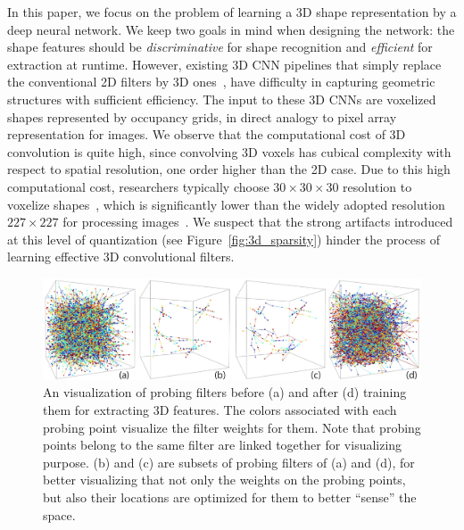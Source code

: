 In this paper, we focus on the problem of learning a 3D shape representation by a deep neural network. We keep two goals in mind when designing the network: the shape features should be \emph{discriminative} for shape recognition and \emph{efficient} for extraction at runtime. However, existing 3D CNN pipelines that simply replace the conventional 2D filters by 3D ones~\cite{WU_CVPR15_3D,Maturana_IROS15_VoxNet}, have difficulty in capturing geometric structures with sufficient efficiency. The input to these 3D CNNs are voxelized shapes represented by occupancy grids, in direct analogy to pixel array representation for images. We observe that the computational cost of 3D convolution is quite high, since convolving 3D voxels has cubical complexity with respect to spatial resolution, one order higher than the 2D case. Due to this high computational cost, researchers typically choose $30 \times 30 \times 30$ resolution to voxelize shapes~\cite{WU_CVPR15_3D,Maturana_IROS15_VoxNet}, which is significantly lower than the widely adopted resolution $227\times 227$ for processing images~\cite{Russakovsky_IJCV15_ImageNet}. We suspect that the strong artifacts introduced at this level of quantization (see Figure~\ref{fig:3d_sparsity}) hinder the process of learning effective 3D convolutional filters.

\begin{figure}[t!]
	\vspace{-0.5cm}
	\begin{center}
		\includegraphics[width=0.9\linewidth]{figures/teaser}
	\end{center}
	\vspace{-0.3cm}
	\caption{An visualization of probing filters before (a) and after (d) training them for extracting 3D features. The colors associated with each probing point visualize the filter weights for them. Note that probing points belong to the same filter are linked together for visualizing purpose. (b) and (c) are subsets of probing filters of (a) and (d), for better visualizing that not only the weights on the probing points, but also their locations are optimized for them to better ``sense'' the space.}
	\label{fig:teaser}
	\vspace{-0.6cm}
\end{figure}

